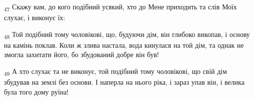 \begin{tcolorbox}
\textsubscript{47} Скажу вам, до кого подібний усякий, хто до Мене приходить та слів Моїх слухає, і виконує їх:
\end{tcolorbox}
\begin{tcolorbox}
\textsubscript{48} Той подібний тому чоловікові, що, будуючи дім, він глибоко викопав, і основу на камінь поклав. Коли ж злива настала, вода кинулася на той дім, та однак не змогла захитати його, бо збудований добре він був!
\end{tcolorbox}
\begin{tcolorbox}
\textsubscript{49} А хто слухає та не виконує, той подібний тому чоловікові, що свій дім збудував на землі без основи. І наперла на нього ріка, і зараз упав він, і велика була того дому руїна!
\end{tcolorbox}
